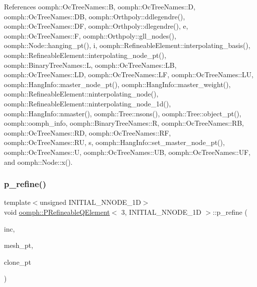 References oomph\+::\+Oc\+Tree\+Names\+::B, oomph\+::\+Oc\+Tree\+Names\+::D, oomph\+::\+Oc\+Tree\+Names\+::\+DB, oomph\+::\+Orthpoly\+::ddlegendre(), oomph\+::\+Oc\+Tree\+Names\+::\+DF, oomph\+::\+Orthpoly\+::dlegendre(), e, oomph\+::\+Oc\+Tree\+Names\+::F, oomph\+::\+Orthpoly\+::gll\+\_\+nodes(), oomph\+::\+Node\+::hanging\+\_\+pt(), i, oomph\+::\+Refineable\+Element\+::interpolating\+\_\+basis(), oomph\+::\+Refineable\+Element\+::interpolating\+\_\+node\+\_\+pt(), oomph\+::\+Binary\+Tree\+Names\+::L, oomph\+::\+Oc\+Tree\+Names\+::\+LB, oomph\+::\+Oc\+Tree\+Names\+::\+LD, oomph\+::\+Oc\+Tree\+Names\+::\+LF, oomph\+::\+Oc\+Tree\+Names\+::\+LU, oomph\+::\+Hang\+Info\+::master\+\_\+node\+\_\+pt(), oomph\+::\+Hang\+Info\+::master\+\_\+weight(), oomph\+::\+Refineable\+Element\+::ninterpolating\+\_\+node(), oomph\+::\+Refineable\+Element\+::ninterpolating\+\_\+node\+\_\+1d(), oomph\+::\+Hang\+Info\+::nmaster(), oomph\+::\+Tree\+::nsons(), oomph\+::\+Tree\+::object\+\_\+pt(), oomph\+::oomph\+\_\+info, oomph\+::\+Binary\+Tree\+Names\+::R, oomph\+::\+Oc\+Tree\+Names\+::\+RB, oomph\+::\+Oc\+Tree\+Names\+::\+RD, oomph\+::\+Oc\+Tree\+Names\+::\+RF, oomph\+::\+Oc\+Tree\+Names\+::\+RU, s, oomph\+::\+Hang\+Info\+::set\+\_\+master\+\_\+node\+\_\+pt(), oomph\+::\+Oc\+Tree\+Names\+::U, oomph\+::\+Oc\+Tree\+Names\+::\+UB, oomph\+::\+Oc\+Tree\+Names\+::\+UF, and oomph\+::\+Node\+::x().

\mbox{\label{classoomph_1_1PRefineableQElement_3_013_00_01INITIAL__NNODE__1D_01_4_a27dcd49d1188203b52a0c482a5466ba6}} 
\subsubsection{\texorpdfstring{p\+\_\+refine()}{p\_refine()}}
{\footnotesize\ttfamily template$<$unsigned I\+N\+I\+T\+I\+A\+L\+\_\+\+N\+N\+O\+D\+E\+\_\+1D$>$ \\
void \hyperlink{classoomph_1_1PRefineableQElement}{oomph\+::\+P\+Refineable\+Q\+Element}$<$ 3, I\+N\+I\+T\+I\+A\+L\+\_\+\+N\+N\+O\+D\+E\+\_\+1D $>$\+::p\+\_\+refine (\begin{DoxyParamCaption}\item[{const int \&}]{inc,  }\item[{\hyperlink{classoomph_1_1Mesh}{Mesh} $\ast$const \&}]{mesh\+\_\+pt,  }\item[{\hyperlink{classoomph_1_1GeneralisedElement}{Generalised\+Element} $\ast$const \&}]{clone\+\_\+pt }\end{DoxyParamCaption})\hspace{0.3cm}{\ttfamily [virtual]}}



